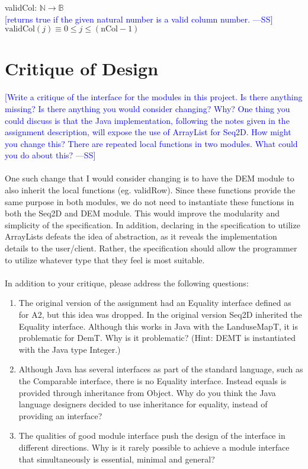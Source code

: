 \documentclass[12pt]{article}
\newcommand{\authornote}[3]{\textcolor{#1}{[#3 ---#2]}}
\newcommand{\authornote}[3]{}
\newcommand{\wss}[1]{\authornote{blue}{SS}{#1}}
\begin{document}
\noindent validCol: $\mathbb{N} \rightarrow \mathbb{B}$\\
\noindent \wss{returns true if the given natural number is a valid column
  number.}\\
$\mbox{validCol}(j) \equiv 0 \le j \le (\mbox{nCol} - 1)$ \\

\newpage

\section*{Critique of Design}

\wss{Write a critique of the interface for the modules in this project.  Is there
anything missing?  Is there anything you would consider changing?  Why?  One
thing you could discuss is that the Java implementation, following the notes
given in the assignment description, will expose the use of ArrayList for Seq2D.
 How might you change this?  There are repeated local functions in two modules.
What could you do about this?}\\\\
One such change that I would consider changing is to have the DEM module to also inherit the local functions (eg. validRow).
Since these functions provide the same purpose in both modules, we do not need to instantiate these functions in both the Seq2D and DEM module. 
This would improve the modularity and simplicity of the specification. 
In addition, declaring in the specification to utilize ArrayLists defeats the idea of abstraction, as it reveals the implementation details to the 
user/client. Rather, the specification should allow the programmer to utilize whatever type that they feel is most suitable. \\\\


In addition to your critique, please address the following questions:

\begin{enumerate}
\item The original version of the assignment had an Equality interface defined
  as for A2, but this idea was dropped.  In the original version Seq2D inherited
  the Equality interface.  Although this works in Java with the LanduseMapT, it is
  problematic for DemT.  Why is it problematic?  (Hint: DEMT is instantiated
  with the Java type Integer.)
\item Although Java has several interfaces as part of the standard language,
  such as the Comparable interface, there is no Equality interface.  Instead
  equals is provided through inheritance from Object.  Why do you think the
  Java language designers decided to use inheritance for equality, instead of
  providing an interface?
\item The qualities of good module interface push the design of the interface in
  different directions. Why is it rarely possible to achieve a module interface
  that simultaneously is essential, minimal and general?
\end{enumerate}
\end{document}
